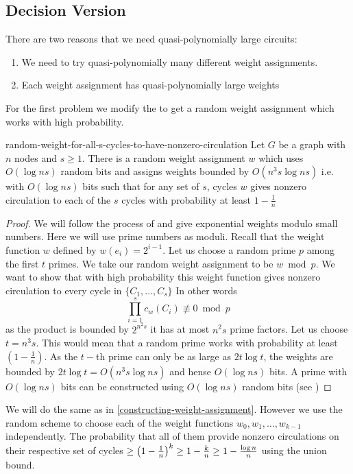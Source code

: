 \subsection{Decision Version}
There are two reasons that we need quasi-polynomially large circuits:\begin{enumerate}[label=(\roman*)]
\item We need to try quasi-polynomially many different weight assignments. 
\item Each weight assignment has quasi-polynomially large weights
\end{enumerate}
For the first problem we modify the  to get a random weight assignment which works with high probability.

\begin{lemma}{\cite{ChariRohatgiSrinivasan_1993_Rou_CONF, KlivansSpielman_2001_Rei_CONF}}{random-weight-for-all-s-cycles-to-have-nonzero-circulation}
	Let $G$ be a graph with $n$ nodes and $s\geq 1$. There is a random weight assignment $w$ which uses $O(\log ns)$ random bits and assigns weights bounded by $O(n^3s\log ns)$ i.e. with $O(\log ns)$ bits such that for any set of $s$, cycles $w$ gives nonzero circulation to each of the $s$ cycles with probability at least $1-\frac{1}{n}$
\end{lemma}
\begin{proof}
	We will follow the process of  and give exponential weights modulo small numbers. Here we will use prime numbers as moduli. Recall that the weight function $w$ defined by $w(e_i)=2^{i-1}$. Let us choose a random prime $p$ among the first $t$ primes. We take our random weight assignment to be $w\bmod p$. We want to show that with high probability this weight function gives nonzero circulation to every cycle in $\{C_1,\dots, C_s\}$ In other words \[
		 \prod\limits_{i=1}^{s} c_w(C_i)\not\equiv 0\bmod p			 
	\]
	as the product is bounded by $2^{n^2s}$ it has at most $n^2s$ prime factors. Let us choose $t=n^3s$. This would mean that a random prime works with probability at least $\left(1-\frac1n\right)$. As the $t-$th prime can only be as large as $2t\log t$, the weights are bounded by $2t\log t=O(n^3s\log ns)$ and hense $O(\log ns)$ bits. A prime with $O(\log ns)$ bits can be constructed using $O(\log ns)$ random bits (see \cite{KlivansSpielman_2001_Rei_CONF})
\end{proof}

We will do the same as in \autoref{constructing-weight-assignment}. However we use the random scheme  to choose each of the weight functions $w_0,w_1,\dots, w_{k-1}$ independently. The probability that all of them provide nonzero circulations on their respective set of cycles $\geq \left(1-\frac1n \right)^k\geq 1-\frac{k}{n}\geq 1-\frac{\log n}{n}$ using the union bound. 

